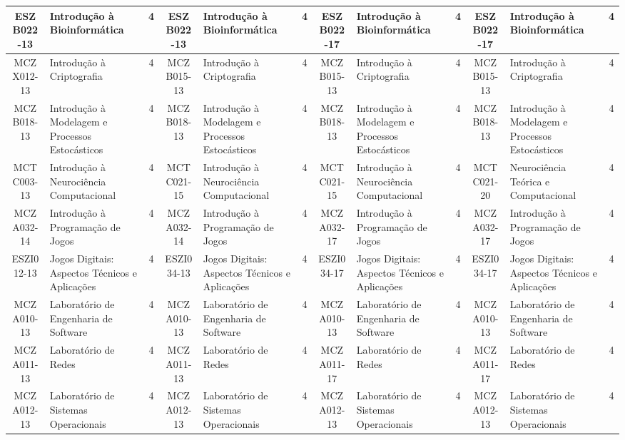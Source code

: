 \documentclass[a4paper]{article}
\begin{document}
\begin{landscape}
{\begin{longtable}{|c|p{.2\textheight}|c||c|p{.2\textheight}|c||c|p{.2\textheight}|c||c|p{.2\textheight}|c|}
ESZB022-13 & Introdução à Bioinformática & 4 &
ESZB022-13 & Introdução à Bioinformática & 4 &
ESZB022-17 & Introdução à Bioinformática & 4 & 
ESZB022-17 & Introdução à Bioinformática & 4\\ \hline

MCZX012-13 & Introdução à Criptografia & 4 &
MCZB015-13 & Introdução à Criptografia & 4 &
MCZB015-13 & Introdução à Criptografia & 4 & 
MCZB015-13 & Introdução à Criptografia & 4\\ \hline

MCZB018-13 & Introdução à Modelagem e Processos Estocásticos & 4 &
MCZB018-13 & Introdução à Modelagem e Processos Estocásticos & 4 &
MCZB018-13 & Introdução à Modelagem e Processos Estocásticos & 4 &
MCZB018-13 & Introdução à Modelagem e Processos Estocásticos & 4\\ \hline

MCTC003-13 & Introdução à Neurociência Computacional & 4 &
MCTC021-15 & Introdução à Neurociência Computacional & 4 &
MCTC021-15 & Introdução à Neurociência Computacional & 4 & 
MCTC021-20 & Neurociência Teórica e Computacional    & 4\\ \hline

MCZA032-14 & Introdução à Programação de Jogos & 4 &
MCZA032-14 & Introdução à Programação de Jogos & 4 &
MCZA032-17 & Introdução à Programação de Jogos & 4 &
MCZA032-17 & Introdução à Programação de Jogos & 4\\ \hline

ESZI012-13 & Jogos Digitais: Aspectos Técnicos e Aplicações & 4 &
ESZI034-13 & Jogos Digitais: Aspectos Técnicos e Aplicações & 4 &
ESZI034-17 & Jogos Digitais: Aspectos Técnicos e Aplicações & 4 &
ESZI034-17 & Jogos Digitais: Aspectos Técnicos e Aplicações & 4\\ \hline

MCZA010-13 & Laboratório de Engenharia de Software & 4 &
MCZA010-13 & Laboratório de Engenharia de Software & 4 &
MCZA010-13 & Laboratório de Engenharia de Software & 4 &
MCZA010-13 & Laboratório de Engenharia de Software & 4\\ \hline

MCZA011-13 & Laboratório de Redes & 4 &
MCZA011-13 & Laboratório de Redes & 4 &
MCZA011-17 & Laboratório de Redes & 4 &
MCZA011-17 & Laboratório de Redes & 4\\ \hline

MCZA012-13 & Laboratório de Sistemas Operacionais & 4 &
MCZA012-13 & Laboratório de Sistemas Operacionais & 4 &
MCZA012-13 & Laboratório de Sistemas Operacionais & 4 & 
MCZA012-13 & Laboratório de Sistemas Operacionais & 4\\ \hline


\end{longtable}}
\end{landscape}
\end{document}
